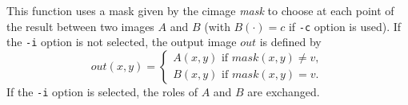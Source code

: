 This function uses a mask given by the cimage {\em mask} to choose
at each point of the result between two images $A$ and $B$ 
(with $B(\cdot)=c$ if \verb+-c+ option is used).
If the \verb+-i+ option is not selected, 
the output image $out$ is defined by
$$out(x,y) = \left\{ \begin{array}{l}
A(x,y) \mbox{ if } mask(x,y) \neq v,\\
B(x,y) \mbox{ if } mask(x,y) = v.
\end{array}\right.$$
If the \verb+-i+ option is selected, the roles of $A$ and $B$
are exchanged.
